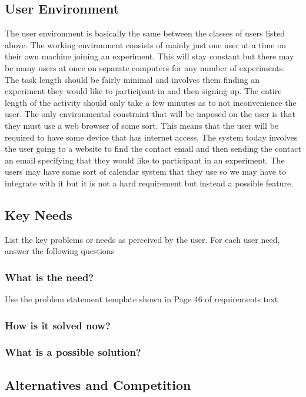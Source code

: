 \documentclass{article}
\begin{document}
\subsection{User Environment}
The user environment is basically the same between the classes of users listed above. The working environment consists of mainly just one user at a time on their own machine joining an experiment. This will stay constant but there may be many users at once on separate computers for any number of experiments. The task length should be fairly minimal and involves them finding an experiment they would like to participant in and then signing up. The entire length of the activity should only take a few minutes as to not inconvenience the user. The only environmental constraint that will be imposed on the user is that they must use a web browser of some sort. This means that the user will be required to have some device that has internet access. The system today involves the user going to a website to find the contact email and then sending the contact an email specifying that they would like to participant in an experiment. The users may have some sort of calendar system that they use so we may have to integrate with it but it is not a hard requirement but instead a possible feature.

\subsection{Key Needs}
List the key problems or needs as perceived by the user. For each user need, answer the following questions

\subsubsection{What is the need?}
Use the problem statement template shown in Page 46 of requirements text

\subsubsection{How is it solved now?}

\subsubsection{What is a possible solution?}

\subsection{Alternatives and Competition}
\end{document}
